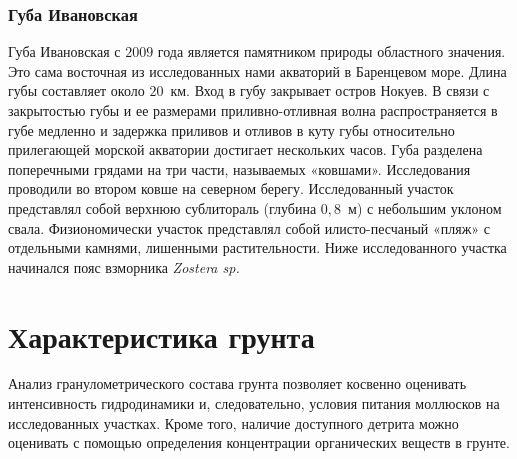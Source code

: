 \subsubsection{Губа Ивановская}
Губа Ивановская с $2009$ года является памятником природы областного значения. 
Это сама восточная из исследованных нами акваторий в Баренцевом море. 
Длина губы составляет около $20$~км. 
Вход в губу закрывает  остров Нокуев.
В связи с  закрытостью губы и ее размерами приливно-отливная волна   распространяется   в   губе   медленно   и   задержка   приливов   и   отливов   в   куту   губы относительно прилегающей морской акватории достигает нескольких часов. 
Губа   разделена   поперечными   грядами   на   три   части,   называемых   «ковшами». 
Исследования   проводили   во   втором   ковше   на   северном   берегу.   
Исследованный   участок представлял   собой   верхнюю   сублитораль   (глубина   $0,8$~м)   с   небольшим   уклоном   свала. 
Физиономически участок представлял собой илисто-песчаный «пляж» с отдельными камнями, лишенными растительности. 
Ниже исследованного участка начинался пояс взморника {\it Zostera  sp.} 

\section{Характеристика грунта}
Анализ   гранулометрического   состава   грунта   позволяет   косвенно   оценивать  интенсивность   гидродинамики   и,   следовательно,   условия   питания   моллюсков   на исследованных   участках.   
Кроме   того,   наличие   доступного   детрита   можно   оценивать   с помощью определения концентрации органических веществ в грунте.

